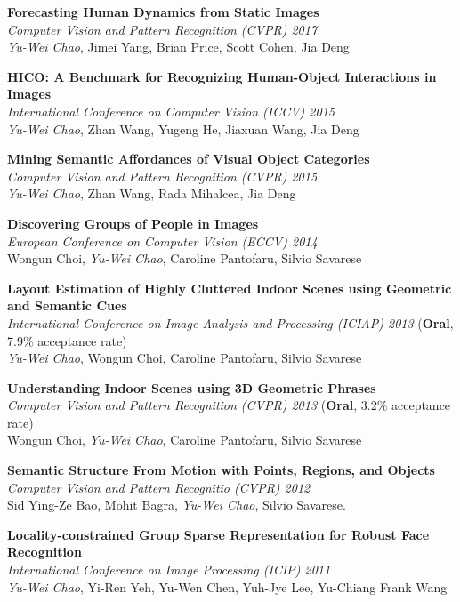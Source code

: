 \documentclass[10pt]{article}
\makeatletter
\newlength{\bibhang}
\newlength{\bibsep}
 {\@listi \global\bibsep\itemsep \global\advance\bibsep by\parsep}
\newenvironment{bibsection}%
        {\begin{list}{}{%
        \setlength{\leftmargin}{0em}
       \setlength{\itemsep}{\bibsep}%
       \setlength{\parsep}{\z@}%
        \setlength{\partopsep}{0pt}%
        \setlength{\topsep}{0pt}}}
        {\end{list}\vspace{-.6\baselineskip}}           %
\makeatother
\begin{document}
\begin{bibsection}
\item[] \textbf{Forecasting Human Dynamics from Static Images}\\ \emph{Computer Vision and Pattern Recognition (CVPR) 2017}\\ \emph{Yu-Wei Chao}, Jimei Yang, Brian Price, Scott Cohen, Jia Deng
\item[] \textbf{HICO: A Benchmark for Recognizing Human-Object Interactions in Images}\\ \emph{International Conference on Computer Vision (ICCV) 2015}\\ \emph{Yu-Wei Chao}, Zhan Wang, Yugeng He, Jiaxuan Wang, Jia Deng
\item[] \textbf{Mining Semantic Affordances of Visual Object Categories}\\ \emph{Computer Vision and Pattern Recognition (CVPR) 2015}\\ \emph{Yu-Wei Chao}, Zhan Wang, Rada Mihalcea, Jia Deng
\item[] \textbf{Discovering Groups of People in Images}\\ \emph{European Conference on Computer Vision (ECCV) 2014}\\ Wongun Choi, \emph{Yu-Wei Chao}, Caroline Pantofaru, Silvio Savarese
\item[] \textbf{Layout Estimation of Highly Cluttered Indoor Scenes using Geometric and Semantic Cues}\\ \emph{International Conference on Image Analysis and Processing (ICIAP) 2013} (\textbf{Oral}, 7.9\% acceptance rate)\\ \emph{Yu-Wei Chao}, Wongun Choi, Caroline Pantofaru, Silvio Savarese
\item[] \textbf{Understanding Indoor Scenes using 3D Geometric Phrases}\\ \emph{Computer Vision and Pattern Recognition (CVPR) 2013} (\textbf{Oral}, 3.2\% acceptance rate)\\ Wongun Choi, \emph{Yu-Wei Chao}, Caroline Pantofaru, Silvio Savarese
\item[] \textbf{Semantic Structure From Motion with Points, Regions, and Objects}\\ \emph{Computer Vision and Pattern Recognitio (CVPR) 2012}\\ Sid Ying-Ze Bao, Mohit Bagra, \emph{Yu-Wei Chao}, Silvio Savarese.
\item[] \textbf{Locality-constrained Group Sparse Representation for Robust Face Recognition}\\ \emph{International Conference on Image Processing (ICIP) 2011}\\ \emph{Yu-Wei Chao}, Yi-Ren Yeh, Yu-Wen Chen, Yuh-Jye Lee, Yu-Chiang Frank Wang
\end{bibsection}
\vspace{.15in} %
\end{document}

